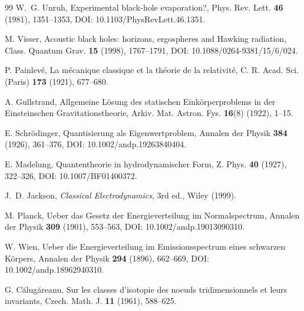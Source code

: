 \documentclass[11pt]{article}
\theoremstyle{definition}
\theoremstyle{plain}
\theoremstyle{remark}
\begin{document}
\begin{thebibliography}{99}
            W.~G. Unruh,
            \newblock Experimental black-hole evaporation?,
            \newblock Phys. Rev. Lett. \textbf{46} (1981), 1351--1353,
            \newblock DOI: 10.1103/PhysRevLett.46.1351.

            M. Visser,
            \newblock Acoustic black holes: horizons, ergospheres and Hawking radiation,
            \newblock Class. Quantum Grav. \textbf{15} (1998), 1767--1791,
            \newblock DOI: 10.1088/0264-9381/15/6/024.

            P. Painlev\'e,
            \newblock La m\'ecanique classique et la th\'eorie de la relativit\'e,
            \newblock C. R. Acad. Sci. (Paris) \textbf{173} (1921), 677--680.

            A. Gullstrand,
            \newblock Allgemeine L\"osung des statischen Eink\"orperproblems in der Einsteinschen Gravitationstheorie,
            \newblock Arkiv. Mat. Astron. Fys. \textbf{16}(8) (1922), 1--15.

            E. Schr\"odinger,
            \newblock Quantisierung als Eigenwertproblem,
            \newblock Annalen der Physik \textbf{384} (1926), 361--376,
            \newblock DOI: 10.1002/andp.19263840404.

            E. Madelung,
            \newblock Quantentheorie in hydrodynamischer Form,
            \newblock Z. Phys. \textbf{40} (1927), 322--326,
            \newblock DOI: 10.1007/BF01400372.

            J.~D. Jackson,
            \newblock \emph{Classical Electrodynamics}, 3rd ed.,
            \newblock Wiley (1999).

            M. Planck,
            \newblock Ueber das Gesetz der Energieverteilung im Normalspectrum,
            \newblock Annalen der Physik \textbf{309} (1901), 553--563,
            \newblock DOI: 10.1002/andp.19013090310.

            W. Wien,
            \newblock Ueber die Energieverteilung im Emissionsspectrum eines schwarzen K\"orpers,
            \newblock Annalen der Physik \textbf{294} (1896), 662--669,
            \newblock DOI: 10.1002/andp.18962940310.

            G. C\u{a}lug\u{a}reanu,
            \newblock Sur les classes d'isotopie des noeuds tridimensionnels et leurs invariants,
            \newblock Czech. Math. J. \textbf{11} (1961), 588--625.


\end{thebibliography}
\end{document}
